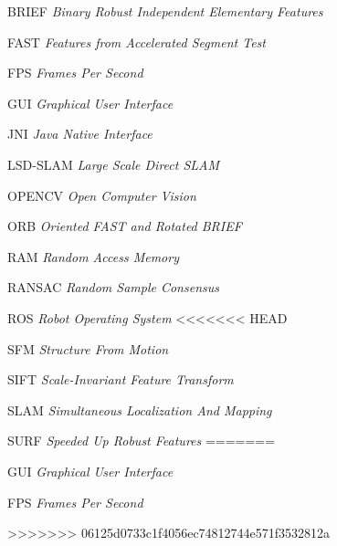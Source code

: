 
\begin{siglas}
\item[BRIEF]\textit{Binary Robust Independent Elementary Features}
\item[FAST]\textit{Features from Accelerated Segment Test}
\item[FPS]\textit{Frames Per Second}
\item[GUI]\textit{Graphical User Interface}
\item[JNI]\textit{Java Native Interface}
\item[LSD-SLAM]\textit{Large Scale Direct SLAM} 
\item[OPENCV]\textit{Open Computer Vision}
\item[ORB]\textit{Oriented FAST and Rotated BRIEF}
\item[RAM]\textit{Random Access Memory}
\item[RANSAC]\textit{Random Sample Consensus}
\item[ROS]\textit{Robot Operating System}
<<<<<<< HEAD
\item[SFM]\textit{Structure From Motion}
\item[SIFT]\textit{Scale-Invariant Feature Transform}
\item[SLAM]\textit{Simultaneous Localization And Mapping}
\item[SURF]\textit{Speeded Up Robust Features}
=======
\item[GUI]\textit{Graphical User Interface}
\item[FPS]\textit{Frames Per Second}

>>>>>>> 06125d0733c1f4056ec74812744e571f3532812a
\end{siglas}
